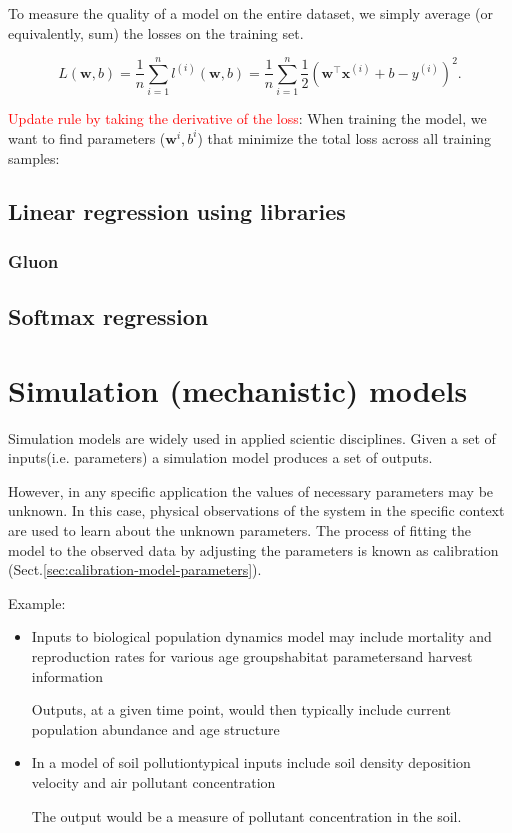 To measure the quality of a model on the entire dataset, we simply average (or equivalently, sum) the losses on the training set.

$$L(\mathbf{w}, b) =\frac{1}{n}\sum_{i=1}^n l^{(i)}(\mathbf{w}, b) =\frac{1}{n} \sum_{i=1}^n \frac{1}{2}\left(\mathbf{w}^\top \mathbf{x}^{(i)} + b - y^{(i)}\right)^2.$$

\textcolor{red}{Update rule by taking the derivative of the loss}:
When training the model, we want to find parameters ($\mathbf{w}^i, b^i$) that minimize the total loss across all training samples:



\section{Linear regression using libraries}


\subsection{Gluon}

\section{Softmax regression}




\chapter{Simulation (mechanistic) models}

Simulation models are widely used in applied scientic disciplines.
Given a set of inputs(i.e. parameters) a simulation model produces a set of
outputs.

However, in any specific application the values of necessary parameters may be
unknown. In this case, physical observations of the system in the specific
context are used to learn about the unknown parameters. The process of fitting
the model to the observed data by adjusting the parameters is known as
calibration (Sect.\ref{sec:calibration-model-parameters}).


Example:
\begin{itemize}
  \item  Inputs to biological population dynamics model may include mortality and reproduction rates for various
age groupshabitat parametersand harvest information

Outputs, at a given time point, would then typically include current population abundance and age structure

  \item In a model of soil pollutiontypical inputs include
soil density deposition velocity and air pollutant concentration

The output would be a measure of pollutant concentration in the soil.

\end{itemize}

